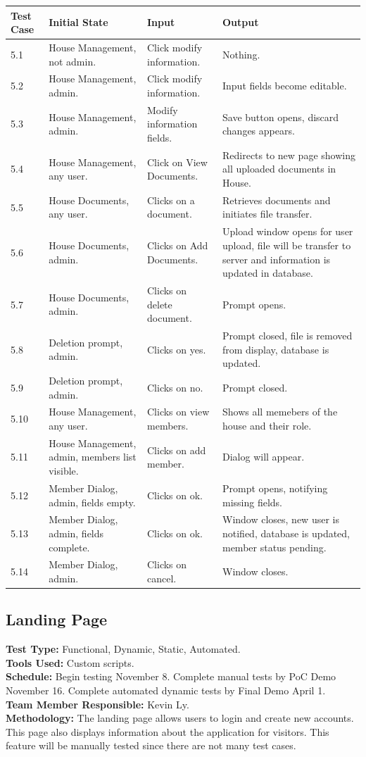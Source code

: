 \documentclass[12pt]{article}
\begin{document}
\begin{longtable}{|p{2cm}|p{3cm}|p{5cm}|p{5cm}|}
\hline
\textbf{Test Case}  & \textbf{Initial State} & \textbf{Input} & \textbf{Output} \\ \hline
5.1 & House Management, not admin. & Click modify information. & Nothing.\\ 
\hline
5.2 & House Management, admin. & Click modify information. & Input fields become editable. \\
\hline
5.3 & House Management, admin. & Modify information fields. & Save button opens, discard changes appears. \\
\hline
5.4 & House Management, any user. & Click on View Documents. & Redirects to new page showing all uploaded documents in House. \\
\hline
5.5 & House Documents, any user. & Clicks on a document. & Retrieves documents and initiates file transfer.\\
\hline
5.6 & House Documents, admin. & Clicks on Add Documents. & Upload window opens for user upload, file will be transfer to server and information is updated in database.\\
\hline
5.7 & House Documents, admin. & Clicks on delete document. & Prompt opens.\\
\hline
5.8 & Deletion prompt, admin. & Clicks on yes. & Prompt closed, file is removed from display, database is updated.\\
\hline
5.9 & Deletion prompt, admin. & Clicks on no. & Prompt closed.\\
\hline
5.10 & House Management, any user. & Clicks on view members. & Shows all memebers of the house and their role.\\
\hline
5.11 & House Management, admin, members list visible. & Clicks on add member. & Dialog will appear.\\
\hline
5.12 & Member Dialog, admin, fields empty. & Clicks on ok. & Prompt opens, notifying missing fields. \\
\hline
5.13 & Member Dialog, admin, fields complete. & Clicks on ok. & Window closes, new user is notified, database is updated, member status pending.\\
\hline
5.14 & Member Dialog, admin. & Clicks on cancel. & Window closes.\\
\hline
\end{longtable}

\subsection{Landing Page}
\textbf{Test Type:} Functional, Dynamic, Static, Automated. \\
\textbf{Tools Used:} Custom scripts. \\
\textbf{Schedule:} Begin testing November 8. Complete manual tests by PoC Demo November 16. Complete automated dynamic tests by Final Demo April 1. \\
\textbf{Team Member Responsible:} Kevin Ly.\\
\textbf{Methodology:} The landing page allows users to login and create new accounts. This page also displays information about the application for visitors. This feature will be manually tested since there are not many test cases.
\end{document}
